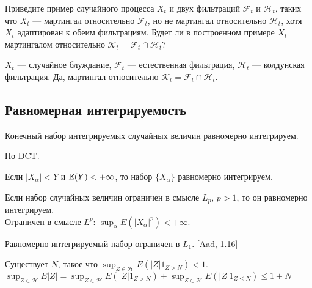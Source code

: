 \begin{problem}
Приведите пример случайного процесса $X_t$ и двух фильтраций $\mathcal{F}_t$ и $\mathcal{H}_t$, таких что $X_t$ --- мартингал относительно $\mathcal{F}_t$, но не мартингал относительно $\mathcal{H}_t$, хотя $X_t$ адаптирован к обеим фильтрациям. Будет ли в построенном примере $X_t$ мартингалом относительно $\mathcal{K}_t=\mathcal{F}_t \cap \mathcal{H}_t$?

\end{problem} 
\begin{solution} 

$X_t$ --- случайное блуждание, $\mathcal{F}_t$ --- естественная фильтрация, $\mathcal{H}_t$ --- колдунская фильтрация. Да, мартингал относительно $\mathcal{K}_t=\mathcal{F}_t \cap \mathcal{H}_t$.
\end{solution}



\subsection{Равномерная интегрируемость} 

\begin{problem}
Конечный набор интегрируемых случайных величин равномерно
интегрируем.  
\end{problem} 
\begin{solution} 
 По DCT. 
\end{solution}

\begin{problem}
Если $|X_{\alpha}|<Y$ и $\mathbb{E}(Y)<+\infty$, то набор $\{X_{\alpha}\}$
равномерно интегрируем. 
\end{problem} 
\begin{solution} 

\end{solution}

\begin{problem}
Если набор случайных величин ограничен в смысле $L_{p}$,
$p>1$, то он равномерно интегрируем. \\
Ограничен в смысле $L^{p}$:
$\sup_{\alpha}E\left(|X_{\alpha}|^{p}\right)<+\infty$. 
\end{problem} 
\begin{solution} 

\end{solution}

\begin{problem}
Равномерно интегрируемый набор ограничен в $L_{1}$. [Aad, 1.16]
\end{problem} 
\begin{solution} 

Существует $N$, такое что $\sup_{Z\in \mathcal{H}}E
\left(|Z|1_{Z>N} \right)<1$. \\
$\sup_{Z\in \mathcal{H}}E |Z|=\sup_{Z\in \mathcal{H}}E
\left(|Z|1_{Z>N} \right)+\sup_{Z\in \mathcal{H}}E \left(|Z|1_{Z\le
N} \right)\le
1+N$ 
\end{solution}

